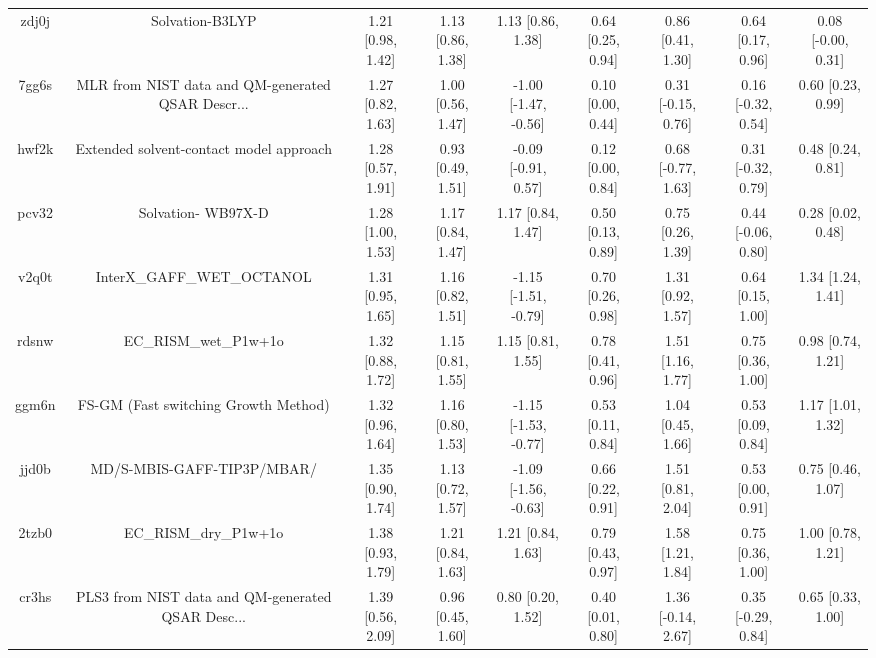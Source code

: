 \documentclass{article}
\begin{document}
\begin{center}
\begin{longtable}{|ccccccccc|}
 zdj0j &                                    Solvation-B3LYP &  1.21 [0.98, 1.42] &  1.13 [0.86, 1.38] &     1.13 [0.86, 1.38] &  0.64 [0.25, 0.94] &    0.86 [0.41, 1.30] &    0.64 [0.17, 0.96] &    0.08 [-0.00, 0.31] \\
 7gg6s &  MLR from NIST data and QM-generated QSAR Descr... &  1.27 [0.82, 1.63] &  1.00 [0.56, 1.47] &  -1.00 [-1.47, -0.56] &  0.10 [0.00, 0.44] &   0.31 [-0.15, 0.76] &   0.16 [-0.32, 0.54] &     0.60 [0.23, 0.99] \\
 hwf2k &            Extended solvent-contact model approach &  1.28 [0.57, 1.91] &  0.93 [0.49, 1.51] &   -0.09 [-0.91, 0.57] &  0.12 [0.00, 0.84] &   0.68 [-0.77, 1.63] &   0.31 [-0.32, 0.79] &     0.48 [0.24, 0.81] \\
 pcv32 &                                 Solvation- WB97X-D &  1.28 [1.00, 1.53] &  1.17 [0.84, 1.47] &     1.17 [0.84, 1.47] &  0.50 [0.13, 0.89] &    0.75 [0.26, 1.39] &   0.44 [-0.06, 0.80] &     0.28 [0.02, 0.48] \\
 v2q0t &                         InterX\_GAFF\_WET\_OCTANOL &  1.31 [0.95, 1.65] &  1.16 [0.82, 1.51] &  -1.15 [-1.51, -0.79] &  0.70 [0.26, 0.98] &    1.31 [0.92, 1.57] &    0.64 [0.15, 1.00] &     1.34 [1.24, 1.41] \\
 rdsnw &                              EC\_RISM\_wet\_P1w+1o &  1.32 [0.88, 1.72] &  1.15 [0.81, 1.55] &     1.15 [0.81, 1.55] &  0.78 [0.41, 0.96] &    1.51 [1.16, 1.77] &    0.75 [0.36, 1.00] &     0.98 [0.74, 1.21] \\
 ggm6n &               FS-GM (Fast switching Growth Method) &  1.32 [0.96, 1.64] &  1.16 [0.80, 1.53] &  -1.15 [-1.53, -0.77] &  0.53 [0.11, 0.84] &    1.04 [0.45, 1.66] &    0.53 [0.09, 0.84] &     1.17 [1.01, 1.32] \\
 jjd0b &                         MD/S-MBIS-GAFF-TIP3P/MBAR/ &  1.35 [0.90, 1.74] &  1.13 [0.72, 1.57] &  -1.09 [-1.56, -0.63] &  0.66 [0.22, 0.91] &    1.51 [0.81, 2.04] &    0.53 [0.00, 0.91] &     0.75 [0.46, 1.07] \\
 2tzb0 &                              EC\_RISM\_dry\_P1w+1o &  1.38 [0.93, 1.79] &  1.21 [0.84, 1.63] &     1.21 [0.84, 1.63] &  0.79 [0.43, 0.97] &    1.58 [1.21, 1.84] &    0.75 [0.36, 1.00] &     1.00 [0.78, 1.21] \\
 cr3hs &  PLS3 from NIST data and QM-generated QSAR Desc... &  1.39 [0.56, 2.09] &  0.96 [0.45, 1.60] &     0.80 [0.20, 1.52] &  0.40 [0.01, 0.80] &   1.36 [-0.14, 2.67] &   0.35 [-0.29, 0.84] &     0.65 [0.33, 1.00] \\

\end{longtable}
\end{center}
\end{document}
